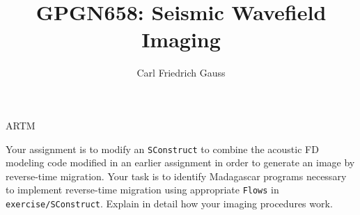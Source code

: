 \author{Carl Friedrich Gauss}
\title{GPGN658: Seismic Wavefield Imaging}{ARTM}

Your assignment is to modify an \texttt{SConstruct} to combine the
acoustic FD modeling code modified in an earlier assignment in order
to generate an image by reverse-time migration. Your task is to
identify Madagascar programs necessary to implement reverse-time
migration using appropriate \texttt{Flows} in
\texttt{exercise/SConstruct}. Explain in detail how your imaging
procedures work.






%


